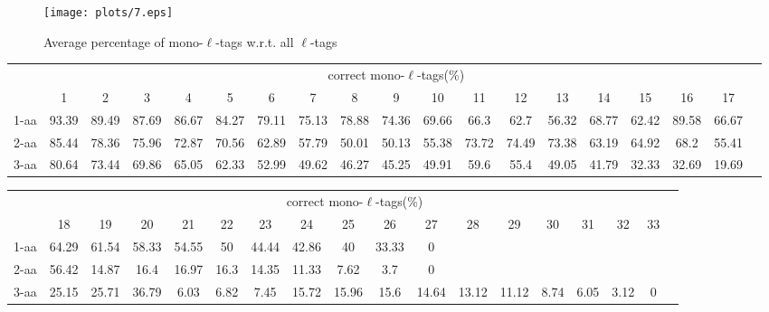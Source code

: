 \documentclass{article}
\begin{document}
\begin{figure}
  \begin{center}
\texttt{[image: plots/7.eps]}

\end{center}
\caption{Average percentage of mono-$\ell$-tags w.r.t. all $\ell$-tags}
  \label{fig:LABEL}
\end{figure}

\begin{landscape}

\begin{table}[h]\tiny
\vspace{3mm}
{\centering
\begin{center}
\begin{tabular}{|l|c|c|c|c|c|c|c|c|c|c|c|c|c|c|c|c|c|c|}
  \hline
  & \multicolumn{ 17 }{|c|}{correct mono-$\ell$-tags(\%)} \\
  \cline{2- 18}
    & 1 & 2 & 3 & 4 & 5 & 6 & 7 & 8 & 9 & 10 & 11 & 12 & 13 & 14 & 15 & 16 & 17\\
  \hline
1-aa  & 93.39 & 89.49 & 87.69 & 86.67 & 84.27 & 79.11 & 75.13 & 78.88 & 74.36 & 69.66 & 66.3 & 62.7 & 56.32 & 68.77 & 62.42 & 89.58 & 66.67\\
2-aa  & 85.44 & 78.36 & 75.96 & 72.87 & 70.56 & 62.89 & 57.79 & 50.01 & 50.13 & 55.38 & 73.72 & 74.49 & 73.38 & 63.19 & 64.92 & 68.2 & 55.41\\
3-aa  & 80.64 & 73.44 & 69.86 & 65.05 & 62.33 & 52.99 & 49.62 & 46.27 & 45.25 & 49.91 & 59.6 & 55.4 & 49.05 & 41.79 & 32.33 & 32.69 & 19.69\\
 \hline
\end{tabular}
\end{center}
\par}
\centering

\vspace{3mm}
\end{table}
\begin{table}[h]\tiny
\vspace{3mm}
{\centering
\begin{center}
\begin{tabular}{|l|c|c|c|c|c|c|c|c|c|c|c|c|c|c|c|c|c|}
  \hline
  & \multicolumn{ 16 }{|c|}{correct mono-$\ell$-tags(\%)} \\
  \cline{2- 17}
    & 18 & 19 & 20 & 21 & 22 & 23 & 24 & 25 & 26 & 27 & 28 & 29 & 30 & 31 & 32 & 33\\
  \hline
1-aa  & 64.29 & 61.54 & 58.33 & 54.55 & 50 & 44.44 & 42.86 & 40 & 33.33 & 0 &  &  &  &  &  & \\
2-aa  & 56.42 & 14.87 & 16.4 & 16.97 & 16.3 & 14.35 & 11.33 & 7.62 & 3.7 & 0 &  &  &  &  &  & \\
3-aa  & 25.15 & 25.71 & 36.79 & 6.03 & 6.82 & 7.45 & 15.72 & 15.96 & 15.6 & 14.64 & 13.12 & 11.12 & 8.74 & 6.05 & 3.12 & 0\\
 \hline
\end{tabular}
\end{center}
\par}
\centering


\end{table}
\end{landscape}
\end{document}
